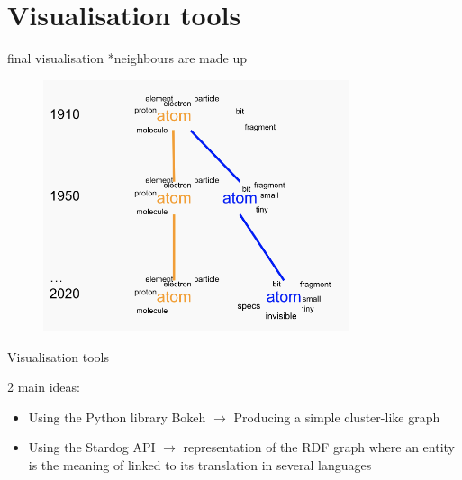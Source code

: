 \documentclass[10pt]{beamer}
\begin{document}
\section{Visualisation tools}
\begin{frame}{final visualisation}
*neighbours are made up 
    \begin{figure}
    \centering
    \includegraphics[width=0.8\textwidth]{final_vis.png}
  \end{figure} 
\end{frame}
\begin{frame}{Visualisation tools}
 
 2 main ideas: 
 \begin{itemize}
     \item Using the Python library Bokeh 
     $\rightarrow$ Producing a simple cluster-like graph 
 \end{itemize}
 
 \begin{itemize}
     \item Using the Stardog API $\rightarrow$ representation of the RDF graph where an entity is the meaning of linked to its translation in several languages
 \end{itemize}
     
\end{frame}

\end{document}
